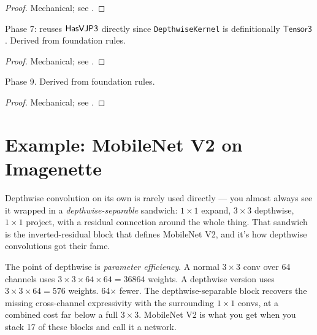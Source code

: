 \begin{proof}
\leanok
Mechanical; see .
\end{proof}

\begin{theorem}
  \label{ax:depthwise_weight_grad_has_vjp3}
  \leanok
  Phase 7: reuses \(\mathsf{HasVJP3}\) directly since \texttt{DepthwiseKernel}
  is definitionally \(\mathsf{Tensor3}\). Derived from foundation rules.
\end{theorem}

\begin{proof}
\leanok
Mechanical; see .
\end{proof}

\begin{theorem}
  \label{ax:depthwise_bias_grad_has_vjp}
  \leanok
  Phase 9. Derived from foundation rules.
\end{theorem}

\begin{proof}
\leanok
Mechanical; see .
\end{proof}

\section{Example: MobileNet V2 on Imagenette}
\label{sec:depthwise_mnv2_example}

Depthwise convolution on its own is rarely used directly --- you
almost always see it wrapped in a \emph{depthwise-separable}
sandwich: $1 \times 1$ expand, $3 \times 3$ depthwise, $1 \times 1$
project, with a residual connection around the whole thing. That
sandwich is the inverted-residual block that defines MobileNet V2,
and it's how depthwise convolutions got their fame.

The point of depthwise is \emph{parameter efficiency}. A normal
$3 \times 3$ conv over 64 channels uses $3 \times 3 \times 64
\times 64 = 36864$ weights. A depthwise version uses $3 \times 3
\times 64 = 576$ weights. 64$\times$ fewer. The depthwise-separable
block recovers the missing cross-channel expressivity with the
surrounding $1 \times 1$ convs, at a combined cost far below a full
$3 \times 3$. MobileNet V2 is what you get when you stack 17 of
these blocks and call it a network.

